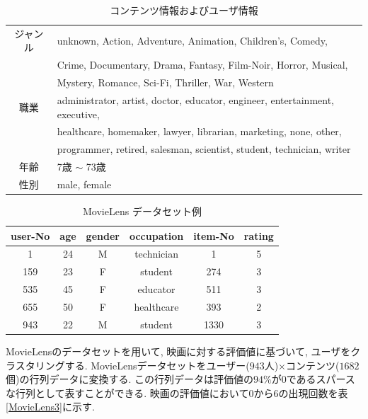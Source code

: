 \documentclass[a4j,12pt]{jarticle}
\begin{document}
\begin{table}[bp]
\begin{center}
\caption{コンテンツ情報およびユーザ情報}   %
\label{MovieLens1}   %
\begin{tabular}{c l}
\hline
ジャンル & unknown, Action, Adventure, Animation, Children's, Comedy, \\
                 & Crime, Documentary, Drama, Fantasy, Film-Noir, Horror, Musical, \\
                 & Mystery, Romance, Sci-Fi, Thriller, War, Western \\
職業          & administrator, artist, doctor, educator, engineer, entertainment, executive, \\
                & healthcare, homemaker, lawyer, librarian, marketing, none, other, \\
                & programmer, retired, salesman, scientist, student, technician, writer \\
年齢 & 7歳 $\sim$ 73歳 \\
性別 & male, female\\ 
\hline
\end{tabular}
\end{center}
\end{table}

\begin{table}[tbp]
\begin{center}
\caption{MovieLens データセット例}   %
\label{MovieLens2}   %
\begin{tabular}{c c c c c c}
\hline
user-No	&	age	&	gender	&	occupation	&	item-No	& rating \\ \hline \hline
1	&	24	&	M	&	technician	&  1  & 5 \\	\hline
159	&    23	&     F	&      student	      &  274 & 3 \\	\hline
535	&	45	&	F	&	educator	&	511	& 3 \\ \hline
655	&	50	&	F	&	healthcare	& 393 & 2 \\	\hline
943	&	22	&	M	&	student	&	1330 & 3 \\  \hline
\end{tabular}
\end{center}
\end{table}

MovieLensのデータセットを用いて, 映画に対する評価値に基づいて, ユーザをクラスタリングする. MovieLensデータセットをユーザー($943$人)$\times$コンテンツ($1682$個)の行列データに変換する. この行列データは評価値の$94\%$が$0$であるスパースな行列として表すことができる. 映画の評価値において$0$から$6$の出現回数を表\ref{MovieLens3}に示す.
\end{document}
